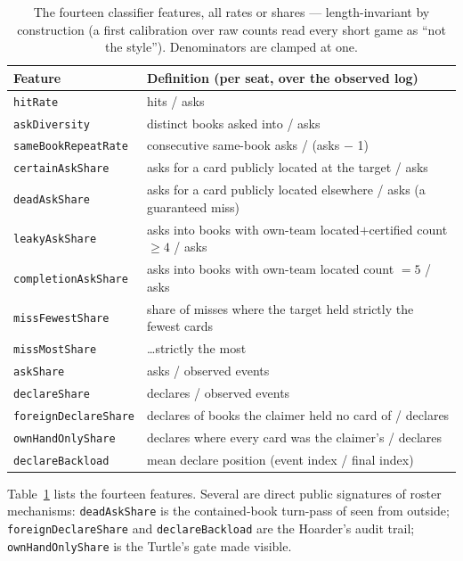 \documentclass[11pt]{article}
\newcommand{\code}[1]{\texttt{#1}}
\begin{document}
\begin{table}[t]
\centering
\caption{The fourteen classifier features, all rates or shares --- length-invariant by
construction (a first calibration over raw counts read every short game as ``not the
style''). Denominators are clamped at one.}
\label{tab:features}
\footnotesize
\begin{tabular}{@{}lp{9.6cm}@{}}
\toprule
Feature & Definition (per seat, over the observed log) \\
\midrule
\code{hitRate}             & hits / asks \\
\code{askDiversity}        & distinct books asked into / asks \\
\code{sameBookRepeatRate}  & consecutive same-book asks / (asks $-$ 1) \\
\code{certainAskShare}     & asks for a card publicly located at the target / asks \\
\code{deadAskShare}        & asks for a card publicly located elsewhere / asks (a guaranteed miss) \\
\code{leakyAskShare}       & asks into books with own-team located$+$certified count $\ge 4$ / asks \\
\code{completionAskShare}  & asks into books with own-team located count $= 5$ / asks \\
\code{missFewestShare}     & share of misses where the target held strictly the fewest cards \\
\code{missMostShare}       & \ldots strictly the most \\
\code{askShare}            & asks / observed events \\
\code{declareShare}        & declares / observed events \\
\code{foreignDeclareShare} & declares of books the claimer held no card of / declares \\
\code{ownHandOnlyShare}    & declares where every card was the claimer's / declares \\
\code{declareBackload}     & mean declare position (event index / final index) \\
\bottomrule
\end{tabular}
\end{table}

Table~\ref{tab:features} lists the fourteen features. Several are direct public
signatures of roster mechanisms: \code{deadAskShare} is the contained-book turn-pass of
\cite{containedpaper} seen from outside; \code{foreignDeclareShare} and
\code{declareBackload} are the Hoarder's audit trail; \code{ownHandOnlyShare} is the
Turtle's gate made visible.
\end{document}
